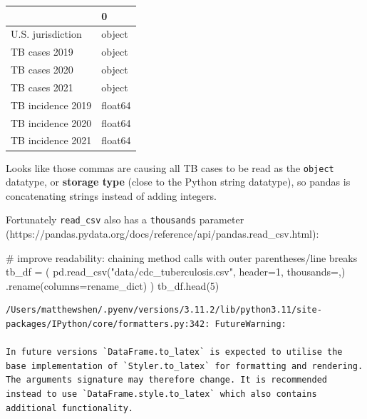 \documentclass[
  letterpaper,
  DIV=11,
  numbers=noendperiod]{scrreprt}
\newenvironment{Shaded}{\begin{snugshade}}{\end{snugshade}}
\newcommand{\CommentTok}[1]{\textcolor[rgb]{0.37,0.37,0.37}{#1}}
\newcommand{\DecValTok}[1]{\textcolor[rgb]{0.68,0.00,0.00}{#1}}
\newcommand{\NormalTok}[1]{\textcolor[rgb]{0.00,0.23,0.31}{#1}}
\newcommand{\OperatorTok}[1]{\textcolor[rgb]{0.37,0.37,0.37}{#1}}
\newcommand{\StringTok}[1]{\textcolor[rgb]{0.13,0.47,0.30}{#1}}
\begin{document}
\begin{tabular}{ll}
\toprule
{} &        0 \\
\midrule
U.S. jurisdiction &   object \\
TB cases 2019     &   object \\
TB cases 2020     &   object \\
TB cases 2021     &   object \\
TB incidence 2019 &  float64 \\
TB incidence 2020 &  float64 \\
TB incidence 2021 &  float64 \\
\bottomrule
\end{tabular}

Looks like those commas are causing all TB cases to be read as the
\texttt{object} datatype, or \textbf{storage type} (close to the Python
string datatype), so pandas is concatenating strings instead of adding
integers.

Fortunately \texttt{read\_csv} also has a \texttt{thousands} parameter
(https://pandas.pydata.org/docs/reference/api/pandas.read\_csv.html):

\begin{Shaded}
\begin{Highlighting}[]
\CommentTok{\# improve readability: chaining method calls with outer parentheses/line breaks}
\NormalTok{tb\_df }\OperatorTok{=}\NormalTok{ (}
\NormalTok{    pd.read\_csv(}\StringTok{"data/cdc\_tuberculosis.csv"}\NormalTok{, header}\OperatorTok{=}\DecValTok{1}\NormalTok{, thousands}\OperatorTok{=}\StringTok{\textquotesingle{},\textquotesingle{}}\NormalTok{)}
\NormalTok{    .rename(columns}\OperatorTok{=}\NormalTok{rename\_dict)}
\NormalTok{)}
\NormalTok{tb\_df.head(}\DecValTok{5}\NormalTok{)}
\end{Highlighting}
\end{Shaded}

\begin{verbatim}
/Users/matthewshen/.pyenv/versions/3.11.2/lib/python3.11/site-packages/IPython/core/formatters.py:342: FutureWarning:

In future versions `DataFrame.to_latex` is expected to utilise the base implementation of `Styler.to_latex` for formatting and rendering. The arguments signature may therefore change. It is recommended instead to use `DataFrame.style.to_latex` which also contains additional functionality.
\end{verbatim}
\end{document}
